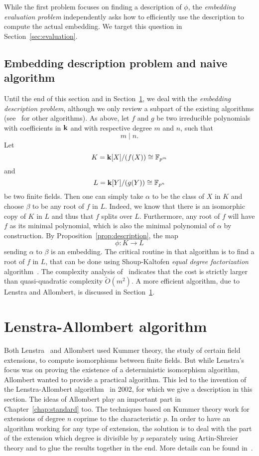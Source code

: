 While the first problem focuses on finding a description of $\phi$, the
\emph{embedding evaluation problem} independently asks how to efficiently use
the description to compute the actual embedding. We target this question in
Section~\ref{sec:evaluation}.

\subsection{Embedding description problem and naive algorithm}

Until the end of this section and in Section~\ref{sec:allombert}, we deal with
the \emph{embedding description problem}, although we only review a subpart of
the existing algorithms (see~\cite{BDDFS17} for other algorithms). As above, let
$f$ and $g$ be two irreducible polynomials with coefficients in $\mathbf{k}$ and with
respective degree $m$ and $n$, such that
\[
  m\mid n.
\]
Let
\[
  K=\mathbf{k}[X]/(f(X))\cong\mathbb{F}_{p^m}
\]
and
\[
  L = \mathbf{k}[Y]/(g(Y))\cong\mathbb{F}_{p^n}
\]
be two finite fields. Then one can simply take $\alpha$ to be the class of $X$ in
$K$ and choose $\beta$ to be any root of $f$ in $L$. Indeed, we know that there
is an isomorphic copy of $K$ in $L$ and thus that $f$ splits over $L$.
Furthermore, any root of $f$ will have $f$ as its minimal polynomial, which is
also the minimal polynomial of $\alpha$ by construction. By
Proposition~\ref{prop:description}, the map 
\[
  \phi:K\to L
\]
sending $\alpha$ to $\beta$ is an embedding. The critical routine in that
algorithm is to find a root of $f$ in $L$, that can be done using Shoup-Kaltofen
\emph{equal degree factorization} algorithm~\cite{KS97}. The complexity analysis
of~\cite{BDDFS17} indicates that the cost is strictly larger than quasi-quadratic
complexity $\tilde O(m^2)$. A more efficient algorithm, due to Lenstra and
Allombert, is discussed in Section~\ref{sec:allombert}.

\section{Lenstra-Allombert algorithm}
\label{sec:allombert}

Both Lenstra~\cite{Lenstra91} and Allombert used
Kummer theory, the study of certain field extensions, to compute isomorphisms
between finite fields. But while Lenstra's focus
was on proving the existence of a deterministic isomorphism algorithm, Allombert 
wanted to provide a practical algorithm. This led to the invention of the
Lenstra-Allombert algorithm~\cite{Allombert02} in 2002, for which we give a
description in this section. The ideas of Allombert play an important part in
Chapter~\ref{chap:standard} too. The techniques based on Kummer theory work
for extensions of degree $n$ coprime to the characteristic $p$. In order to have
an algorithm working for any type of extension, the solution is to deal with the
part of the extension which degree is divisible by $p$ separately using
Artin-Shreier theory and to glue the results together in the end. More details
can be found in~\cite[Section 3.2]{BDDFS17}.

